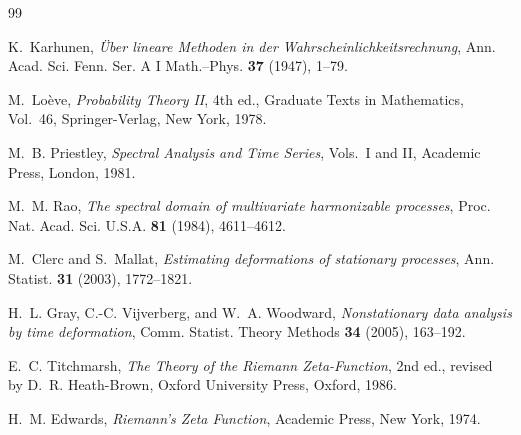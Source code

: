 \documentclass[11pt]{amsart}
\theoremstyle{definition}
\begin{document}
\begin{thebibliography}{99}

 K.~Karhunen, \emph{\"Uber lineare Methoden in der
Wahrscheinlichkeitsrechnung}, Ann. Acad. Sci. Fenn. Ser. A I Math.--Phys.
\textbf{37} (1947), 1--79.

 M.~Lo\`eve, \emph{Probability Theory II}, 4th ed.,
Graduate Texts in Mathematics, Vol.~46, Springer-Verlag, New York, 1978.

 M.~B. Priestley, \emph{Spectral Analysis and
Time Series}, Vols.~I and II, Academic Press, London, 1981.

 M.~M. Rao, \emph{The spectral domain of multivariate
harmonizable processes}, Proc. Nat. Acad. Sci. U.S.A. \textbf{81} (1984),
4611--4612.

 M.~Clerc and S.~Mallat, \emph{Estimating
deformations of stationary processes}, Ann. Statist. \textbf{31}
(2003), 1772--1821.

 H.~L. Gray, C.-C. Vijverberg, and W.~A.
Woodward, \emph{Nonstationary data analysis by time deformation},
Comm. Statist. Theory Methods \textbf{34} (2005), 163--192.

 E.~C. Titchmarsh, \emph{The Theory of the Riemann
Zeta-Function}, 2nd ed., revised by D.~R. Heath-Brown, Oxford University
Press, Oxford, 1986.

 H.~M. Edwards, \emph{Riemann's Zeta Function}, Academic
Press, New York, 1974.

\end{thebibliography}
\end{document}
